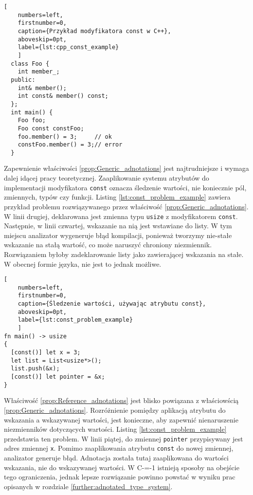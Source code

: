 \begin{minipage}{\linewidth}
  \begin{lstlisting}[
    numbers=left,
    firstnumber=0,
    caption={Przykład modyfikatora const w C++},
    aboveskip=0pt,
    label={lst:cpp_const_example}
    ]
  class Foo {
    int member_;
  public:
    int& member();
    int const& member() const;
  };
  int main() {
    Foo foo;
    Foo const constFoo;
    foo.member() = 3;     // ok
    constFoo.member() = 3;// error
  }
  \end{lstlisting}
\end{minipage}

Zapewnienie właściwości \ref{prop:Generic_adnotations} jest najtrudniejsze i wymaga dalej idącej pracy teoretycznej.
Zaaplikowanie systemu atrybutów do implementacji modyfikatora \lstinline{const} oznacza śledzenie wartości, nie koniecznie pól, zmiennych, typów czy funkcji.
Listing \ref{lst:const_problem_example} zawiera przykład problemu rozwiązywanego przez właściwość \ref{prop:Generic_adnotations}.
W linii drugiej, deklarowana jest zmienna typu \lstinline{usize} z modyfikatorem \lstinline{const}.
Następnie, w linii czwartej, wskazanie na nią jest wstawiane do listy.
W tym miejscu analizator wygeneruje błąd kompilacji, ponieważ tworzymy nie-stałe wskazanie na stałą wartość, co może naruszyć chroniony niezmiennik.
Rozwiązaniem byłoby zadeklarowanie listy jako zawierającej wskazania na stałe.
W obecnej formie języka, nie jest to jednak możliwe.

\begin{minipage}{\linewidth}
  
  \begin{lstlisting}[
    numbers=left,
    firstnumber=0,
    caption={Śledzenie wartości, używając atrybutu const},
    aboveskip=0pt,
    label={lst:const_problem_example}
    ]
fn main() -> usize
{
  [const()] let x = 3;
  let list = List<usize*>();
  list.push(&x);
  [const()] let pointer = &x;
}
\end{lstlisting}
\end{minipage}


Właściwość \ref{prop:Reference_adnotations} jest blisko powiązana z właściowścią \ref{prop:Generic_adnotations}.
Rozróżnienie pomiędzy aplikacją atrybutu do wskazania a wskazywanej wartości, jest konieczne, aby zapewnić nienaruszenie niezmienników dotyczących wartości.
Listing \ref{lst:const_problem_example} przedstawia ten problem.
W linii piątej, do zmiennej \lstinline{pointer} przypisywany jest adres zmiennej \lstinline{x}.
Pomimo zaaplikowania atrybutu \lstinline{const} do nowej zmiennej, analizator generuje błąd.
Adnotacja została tutaj zaaplikowana do wartości wskazania, nie do wskazywanej wartości.
W C-=-1 istnieją sposoby na obejście tego ograniczenia, jednak lepsze rozwiązanie powinno powstać w wyniku prac opisanych w rozdziale \ref{further:adnotated_type_system}.

